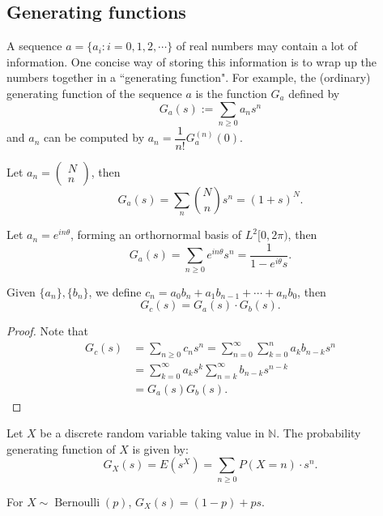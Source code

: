 \documentclass[11pt,singlecolumn, openany, citestyle=authoryear]{elegantbook}
\begin{document}
\begin{CJK}{UTF8}{gbsn}
\section{Generating functions}
\begin{definition}
    A sequence $a = \{a_i: i = 0, 1, 2,\cdots\}$
    of real numbers may contain a lot of information. One concise way of storing this
    information is to wrap up the numbers together in a ``generating function".
    For example, the (ordinary) generating function of the sequence $a$ is the function
    $G_a$ defined by
    $$
    G_a(s):= \sum_{n\geqslant 0}a_n s^n
    $$
    and $a_n$ can be computed by $a_n = \dfrac{1}{n!}G_a^{(n)}(0)$.
\end{definition}
\begin{example}
    Let $a_n = \left(\begin{array}{c}
        N\\
        n
        \end{array}\right)$, then 
        $$
        G_a(s)=\sum_n \binom{N}{n} s^n = (1+s)^N.
        $$
\end{example}
\begin{example}
    Let $a_n = e^{in\theta}$, forming an orthornormal basis of $L^2[0,2\pi)$, then 
    $$
    G_a(s)=\sum_{n\geqslant 0} e^{in\theta}s^n = \frac{1}{1-e^{i\theta}s}.
    $$
\end{example}
\begin{theorem}
    Given $\{a_n\},\{b_n\}$, we define $c_n=a_0b_n+a_1b_{n-1}+\cdots+a_nb_0$, then 
    $$
    G_c(s) = G_a(s)\cdot G_b(s). 
    $$
\end{theorem}
\begin{proof}
    Note that 
    \begin{align*}
        G_c(s)&=\sum_{n\geqslant 0} c_ns^n = 
        \sum_{n=0}^\infty\sum_{k=0}^{n}a_k b_{n-k}s^n \\
        &=\sum_{k=0}^\infty a_ks^k \sum_{n=k}^{\infty} b_{n-k}s^{n-k}\\
        &=G_a(s)G_b(s).
    \end{align*}
\end{proof}
\begin{definition}
    Let $X$ be a discrete random variable taking value in $\mathbb{N}$. The probability
    generating function of $X$ is given by:
    $$
    G_X(s) =E(s^X) = \sum_{n\geqslant 0}P(X=n)\cdot s^n.
    $$
\end{definition}
\begin{example}
    For $X\sim \operatorname{Bernoulli}(p)$, $G_X(s)=(1-p)+ps$.

\end{example}
\end{CJK}
\end{document}
